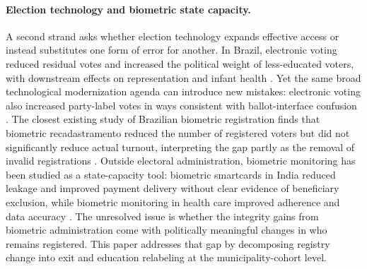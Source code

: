 \paragraph{Election technology and biometric state capacity.}
A second strand asks whether election technology expands effective access or instead substitutes one form of error for another. In Brazil, electronic voting reduced residual votes and increased the political weight of less-educated voters, with downstream effects on representation and infant health \cite{Fujiwara2015VotingTechnoloPolitica}. Yet the same broad technological modernization agenda can introduce new mistakes: electronic voting also increased party-label votes in ways consistent with ballot-interface confusion \cite{Zucco2016TradingOldErrors}. The closest existing study of Brazilian biometric registration finds that biometric recadastramento reduced the number of registered voters but did not significantly reduce actual turnout, interpreting the gap partly as the removal of invalid registrations \cite{forquesatoRodrigues2023}. Outside electoral administration, biometric monitoring has been studied as a state-capacity tool: biometric smartcards in India reduced leakage and improved payment delivery without clear evidence of beneficiary exclusion, while biometric monitoring in health care improved adherence and data accuracy \cite{Muralidharan2016BuildingStateCapacity,Bossuroy2024BiometriMonitoriService}. The unresolved issue is whether the integrity gains from biometric administration come with politically meaningful changes in who remains registered. This paper addresses that gap by decomposing registry change into exit and education relabeling at the municipality-cohort level.

